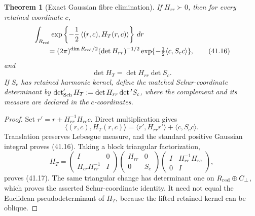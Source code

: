 \documentclass[11pt,oneside]{book}
\newtheorem{theorem}{Theorem}[chapter]
\theoremstyle{definition}
\theoremstyle{remark}
\begin{document}
\begin{theorem}[Exact Gaussian fibre elimination]
\label{thm:e8v41-gaussian-fibre}
If \(H_{rr}\succ0\), then for every retained coordinate \(c\),
\[
 \begin{split}
 &\int_{R_{\rm red}}\exp\left\{-\frac12
 \left\langle(r,c),H_T(r,c)\right\rangle\right\}\,dr\\
 &\hspace{2em}=(2\pi)^{\dim R_{\rm red}/2}(\det H_{rr})^{-1/2}
 \exp\{-\tfrac12\langle c,S_cc\rangle\},                        \tag{41.16}
 \end{split}
\]
and
\[
 \boxed{\det H_T=\det H_{rr}\det S_c.}                          \tag{41.17}
\]
If \(S_c\) has retained harmonic kernel, define the matched
Schur-coordinate determinant by
\(\det_{\rm Sch}'H_T:=\det H_{rr}\det{}'S_c\), where the complement
and its measure are declared in the \(c\)-coordinates.
\end{theorem}

\begin{proof}
Set \(r'=r+H_{rr}^{-1}H_{rc}c\).  Direct multiplication gives
\[
 \langle(r,c),H_T(r,c)\rangle
 =\langle r',H_{rr}r'\rangle+\langle c,S_cc\rangle.
\]
Translation preserves Lebesgue measure, and the standard positive
Gaussian integral proves (41.16).  Taking a block triangular
factorization,
\[
 H_T=
 \begin{pmatrix}I&0\\H_{cr}H_{rr}^{-1}&I\end{pmatrix}
 \begin{pmatrix}H_{rr}&0\\0&S_c\end{pmatrix}
 \begin{pmatrix}I&H_{rr}^{-1}H_{rc}\\0&I\end{pmatrix},
\]
proves (41.17).  The same triangular change has determinant one on
\(R_{\rm red}\oplus C_\perp\), which proves the asserted
Schur-coordinate identity.  It need not equal the Euclidean
pseudodeterminant of \(H_T\), because the lifted retained kernel can
be oblique.
\end{proof}
\end{document}
